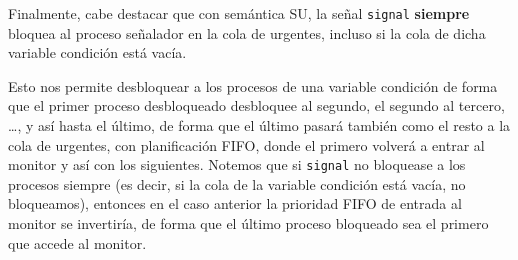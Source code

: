 Finalmente, cabe destacar que con semántica SU, la señal \verb|signal| \textbf{siempre} bloquea al proceso señalador en la cola de urgentes, incluso si la cola de dicha variable condición está vacía.

Esto nos permite desbloquear a los procesos de una variable condición de forma que el primer proceso desbloqueado desbloquee al segundo, el segundo al tercero, \ldots, y así hasta el último, de forma que el último pasará también como el resto a la cola de urgentes, con planificación FIFO, donde el primero volverá a entrar al monitor y así con los siguientes. Notemos que si \verb|signal| no bloquease a los procesos siempre (es decir, si la cola de la variable condición está vacía, no bloqueamos), entonces en el caso anterior la prioridad FIFO de entrada al monitor se invertiría, de forma que el último proceso bloqueado sea el primero que accede al monitor.

